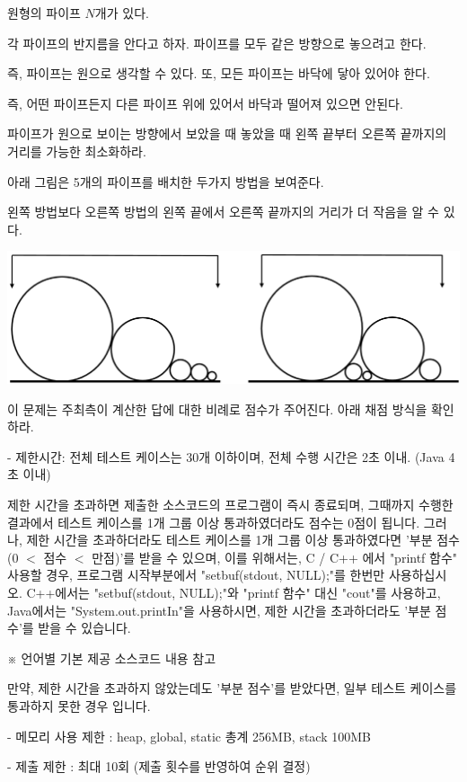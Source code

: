 \documentclass [12pt] {oblivoir}
\begin{document}
원형의 파이프 $N$개가 있다.

각 파이프의 반지름을 안다고 하자. 파이프를 모두 같은 방향으로 놓으려고 한다.

즉, 파이프는 원으로 생각할 수 있다. 또, 모든 파이프는 바닥에 닿아 있어야 한다.

즉, 어떤 파이프든지 다른 파이프 위에 있어서 바닥과 떨어져 있으면 안된다.

파이프가 원으로 보이는 방향에서 보았을 때 놓았을 때 왼쪽 끝부터 오른쪽 끝까지의 거리를 가능한 최소화하라.

아래 그림은 5개의 파이프를 배치한 두가지 방법을 보여준다.

왼쪽 방법보다 오른쪽 방법의 왼쪽 끝에서 오른쪽 끝까지의 거리가 더 작음을 알 수 있다.

\includegraphics[scale=0.5]{n4.png}


이 문제는 주최측이 계산한 답에 대한 비례로 점수가 주어진다. 아래 채점 방식을 확인하라.

- 제한시간: 전체 테스트 케이스는 30개 이하이며, 전체 수행 시간은 2초 이내. (Java 4초 이내)

제한 시간을 초과하면 제출한 소스코드의 프로그램이 즉시 종료되며, 그때까지 수행한 결과에서 테스트 케이스를 1개 그룹 이상 통과하였더라도 점수는 0점이 됩니다.
그러나, 제한 시간을 초과하더라도 테스트 케이스를 1개 그룹 이상 통과하였다면 '부분 점수(0 $<$ 점수 $<$ 만점)'를 받을 수 있으며, 이를 위해서는, C / C++ 에서 "printf 함수" 사용할 경우, 프로그램 시작부분에서 "setbuf(stdout, NULL);"를 한번만 사용하십시오.
C++에서는 "setbuf(stdout, NULL);"와 "printf 함수" 대신 "cout"를 사용하고, Java에서는 "System.out.printIn"을 사용하시면, 제한 시간을 초과하더라도 '부분 점수'를 받을 수 있습니다.

※ 언어별 기본 제공 소스코드 내용 참고

만약, 제한 시간을 초과하지 않았는데도 '부분 점수'를 받았다면, 일부 테스트 케이스를 통과하지 못한 경우 입니다.

- 메모리 사용 제한 : heap, global, static 총계 256MB, stack 100MB

- 제출 제한 : 최대 10회 (제출 횟수를 반영하여 순위 결정)
\end{document}
